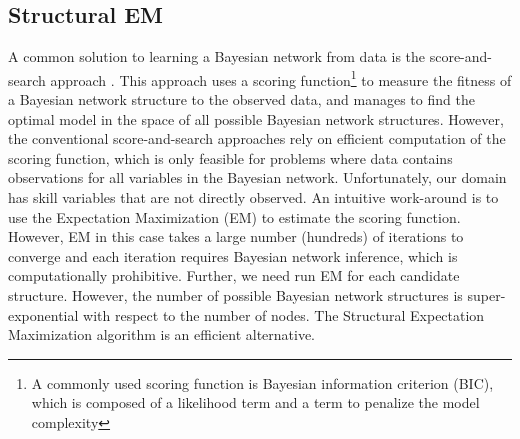\documentclass{edm_template}
\begin{document}
\subsection{Structural EM}
\label{sec:sem}

A common solution to learning a Bayesian network from data is the score-and-search approach \cite{cooper1992bayesian,heckerman1997bayesian}.
This approach uses a scoring function\footnote{A commonly used scoring function is Bayesian information criterion (BIC), which is composed of a likelihood term and a term to penalize the model complexity} to measure the fitness of a Bayesian network structure to the observed data, 
and manages to find the optimal model in the space of all possible Bayesian network structures.
However, the conventional score-and-search approaches rely on efficient computation of the scoring function, 
which is only feasible for problems where data contains observations for all variables in the Bayesian network.
Unfortunately, our domain has skill variables that are not directly observed.
An intuitive work-around is to use the Expectation Maximization (EM) to estimate the scoring function.
However, EM in this case takes a large number (hundreds) of iterations to converge and each iteration requires Bayesian network inference, 
which is computationally prohibitive.
Further, we need run EM for each candidate structure. However, the number of possible Bayesian network structures is super-exponential with respect to the number of nodes.
The Structural Expectation Maximization algorithm \cite{friedman1997learning,friedman1998bayesian} is an efficient alternative.
\end{document}

